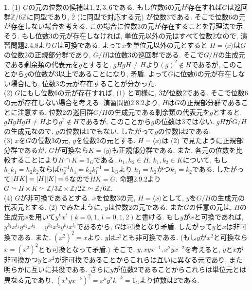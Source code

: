 \documentclass{article}
\theoremstyle{definition}
\newtheorem{ans}{}
\numberwithin{ans}{subsection}
\newcommand{\Z}[1]{\mathbb{Z}/#1\mathbb{Z}}
\DeclarePairedDelimiter{\abs}{\lvert}{\rvert}
\begin{document}
\begin{ans}
  (1) $G$の元の位数の候補は$1, 2, 3, 6$である.
  もし位数$6$の元が存在すれば$G$は巡回群$\Z{6}$に同型であり,
  $\overline{2}$ (に同型で対応する元) が位数$3$である.
  そこで位数$6$の元が存在しない場合を考える.
  この場合に位数$3$の元が存在することを背理法で示そう.
  もし位数$3$の元が存在しなければ, 単位元以外の元はすべて位数$2$なので,
  演習問題2.4.8より$G$は可換である. よって$x$を単位元以外の元とすると
  $H = \langle x \rangle$は$G$の位数$2$の正規部分群であり, $G/H$は位数$3$の巡回群である.
  そこで$G/H$の生成元である剰余類の代表元を$g$とすると,
  $gHgH \neq H$より$(g)^2 \notin H$であるが,
  このことから$g$の位数が$3$以上であることになり, 矛盾.
  よって$G$に位数$6$の元が存在しない場合にも, 位数$3$の元が存在することが分かった.\\
  (2) $G$にもし位数$6$の元が存在すれば, (1) と同様に, $\overline{3}$が位数$2$である.
  そこで位数$6$の元が存在しない場合を考える.
  演習問題2.8.2より, $H$は$G$の正規部分群であることに注意する.
  位数$2$の巡回群$G/H$の生成元である剰余類の代表元を$g$とすると,
  $gHgHgH \neq H$より$g^3 \notin H$であるが,
  このことから$g$の位数は$3$ではない. $gH$が$G/H$の生成元なので, $g$の位数は$1$でもない.
  したがって$g$の位数は$2$である.\\
  (3) $x$を$G$の位数$3$の元, $y$を位数$2$の元とする.
  $H = \langle x \rangle$は (2) で見たように正規部分群であるが,
  $G$が可換なら$K = \langle y \rangle$も正規部分群である.
  また, 各元の位数を比較することにより$H \cap K = 1_G$である.
  $h_1, h_2 \in H$, $k_1, k_2 \in K$について, もし$h_1k_1 = h_2k_2$ならば$h_2^{-1}h_1 = k_2k_1^{-1} = 1_G$より
  $h_1 = h_2$かつ$k_1 = k_2$である. したがって$\abs{HK} = \abs{H}\abs{K} = 6$なので$HK = G$.
  命題2.9.2より$G \simeq H \times K \simeq \Z{3} \times \Z{2} \simeq \Z{6}$.\\
  (4) $G$が非可換であるとする. $x$を位数$3$の元, $H = \langle x \rangle$として, $y$を$G/H$の生成元の代表元とする.
  (2) でみたように, $y$は位数$2$の元である.
  また$G$の任意の元は, $H$の生成元$x$を用いて$y^kx^l\ (k = 0, 1,\ l = 0, 1, 2)$と書ける.
  もし$y$が$x$と可換であれば, $y^{k_1}x^{l_1}y^{k_2}x^{l_2} = y^{k_2}x^{l_2}y^{k_1}x^{l_1}$であるから,
  $G$は可換となり矛盾. したがって$y$と$x$は非可換である.
  また, $(x^2)^2 = x$より, $y$は$x^2$とも非可換である. (もし$y$が$x^2$と可換なら$x = (x^2)^2$とも可換となって矛盾.)
  そこで, $y, xyx^{-1}, x^2yx^{-2}$を考えると,
  $y$と$x$が非可換かつ$y$と$x^2$が非可換であることからこれらは互いに異なる元であり,
  また明らかに互いに共役である.
  さらに$y$が位数$2$であることからこれらは単位元とは異なる元であり, $(x^kyx^{-k})^2 = x^ky^2k^{-k} = 1_G$より位数は$2$である.

\end{ans}
\end{document}
